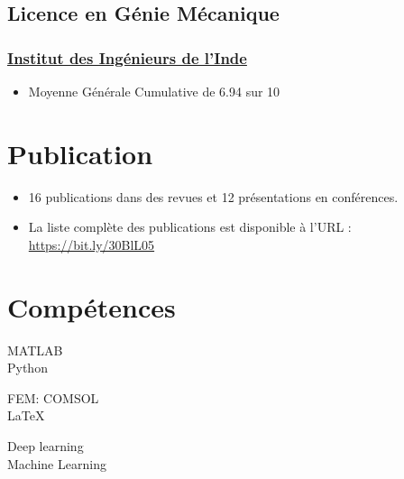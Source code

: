\documentclass{my_cv}%
\begin{document}
\subsection{Licence en Génie Mécanique}
\subsubsection{\faInstitution \hspace{0.2em} \href{https://www.ieindia.org/webui/iei-home.aspx}{Institut des Ingénieurs de l'Inde}}
\begin{itemize}[leftmargin=0.15in]
\setlength\itemsep{-0.1em}
\color{mygray}
\item Moyenne Générale Cumulative de 6.94 sur 10
\end{itemize}
\section{Publication}
\vspace{1em}
\begin{itemize}
    \item 16 publications dans des revues et 12 présentations en conférences.
    \item La liste complète des publications est disponible à l'URL : \href{https://bit.ly/30BlL05}{https://bit.ly/30BlL05}
\end{itemize}

\section{Compétences}
\vspace{1em}
\begin{minipage}{0.35\textwidth}
    MATLAB \\           
  Python \\
   
\end{minipage}
\begin{minipage}{0.35\textwidth}
   FEM: COMSOL \\
   \LaTeX \\

\end{minipage}
\begin{minipage}{0.35\textwidth}
   Deep learning \\
   Machine Learning \\

\end{minipage}
\end{document}
